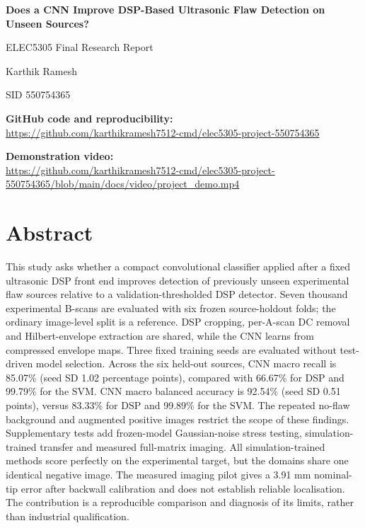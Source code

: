 \documentclass[11pt,a4paper]{article}
\begin{document}
\begin{center}
{\LARGE\bfseries Does a CNN Improve DSP-Based Ultrasonic Flaw Detection on Unseen Sources?\par}
\vspace{10pt}
{\large ELEC5305 Final Research Report\par}
\vspace{7pt}
{\large Karthik Ramesh\par}
{SID 550754365\par}
\end{center}
\vspace{5pt}
\textbf{GitHub code and reproducibility:}\\
\url{https://github.com/karthikramesh7512-cmd/elec5305-project-550754365}

\textbf{Demonstration video:}\\
\url{https://github.com/karthikramesh7512-cmd/elec5305-project-550754365/blob/main/docs/video/project_demo.mp4}
\vspace{7pt}
\section*{Abstract}

This study asks whether a compact convolutional classifier applied after a fixed ultrasonic DSP front end improves detection of previously unseen experimental flaw sources relative to a validation-thresholded DSP detector. Seven thousand experimental B-scans are evaluated with six frozen source-holdout folds; the ordinary image-level split is a reference. DSP cropping, per-A-scan DC removal and Hilbert-envelope extraction are shared, while the CNN learns from compressed envelope maps. Three fixed training seeds are evaluated without test-driven model selection. Across the six held-out sources, CNN macro recall is 85.07\% (seed SD 1.02 percentage points), compared with 66.67\% for DSP and 99.79\% for the SVM. CNN macro balanced accuracy is 92.54\% (seed SD 0.51 points), versus 83.33\% for DSP and 99.89\% for the SVM. The repeated no-flaw background and augmented positive images restrict the scope of these findings. Supplementary tests add frozen-model Gaussian-noise stress testing, simulation-trained transfer and measured full-matrix imaging. All simulation-trained methods score perfectly on the experimental target, but the domains share one identical negative image. The measured imaging pilot gives a 3.91 mm nominal-tip error after backwall calibration and does not establish reliable localisation. The contribution is a reproducible comparison and diagnosis of its limits, rather than industrial qualification.
\end{document}
